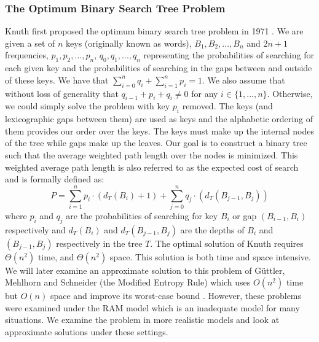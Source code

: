 \documentclass[]{beamer}
\theoremstyle{plain}
\begin{document}
\begin{frame} \frametitle{The Optimum Binary Search Tree Problem}

Knuth first proposed the optimum binary search tree problem in 1971 \cite{knuth1971optimum}. We are given a set of $n$ keys (originally known as words), $B_1, B_2, ..., B_n$ and $2n+1$ frequencies, ${p_1, p_2, ..., p_n}$, ${q_0, q_1, ..., q_n}$ representing the probabilities of searching for each given key and the probabilities of searching in the gaps between and outside of these keys. We have that $ \sum\limits_{i=0}^n q_i + \sum\limits_{i=1}^n p_i = 1$. We also assume that without loss of generality that $q_{i-1}+p_i+q_i \neq 0$ for any $i \in \{1,...,n\}$. Otherwise, we could simply solve the problem with key $p_i$ removed. The keys (and lexicographic gaps between them) are used as keys and the alphabetic ordering of them provides our order over the keys. The keys must make up the internal nodes of the tree while gaps make up the leaves. Our goal is to construct a binary tree such that the average weighted path length over the nodes is minimized.  This weighted average path length is also referred to as the expected cost of search and is formally defined as: 
\begin{equation}\label{1.1}
P = \sum_{i=1}^{n} p_i \cdot (d_T(B_i)+1) + \sum_{j=0}^{n} q_j \cdot(d_T(B_{j-1}, B_j))
\end{equation}
where $p_i$ and $q_j$ are the probabilities of searching for key $B_i$ or gap $(B_{i-1}, B_i)$ respectively and $d_T(B_i)$ and $d_T(B_{j-1}, B_j)$ are the depths of $B_i$ and $(B_{j-1}, B_j)$ respectively in the tree $T$. The optimal solution of Knuth requires $\Theta(n^2)$ time, and $\Theta(n^2)$ space. This solution is both time and space intensive. We will later examine an approximate solution to this problem of G{\"u}ttler, Mehlhorn and Schneider (the Modified Entropy Rule) which uses $O(n^2)$ time but $O(n)$ space and improve its worst-case bound \cite{guttler1980binary}. However, these problems were examined under the RAM model which is an inadequate model for many situations. We examine the problem in more realistic models and look at approximate solutions under these settings.
\end{frame}
\end{document}

